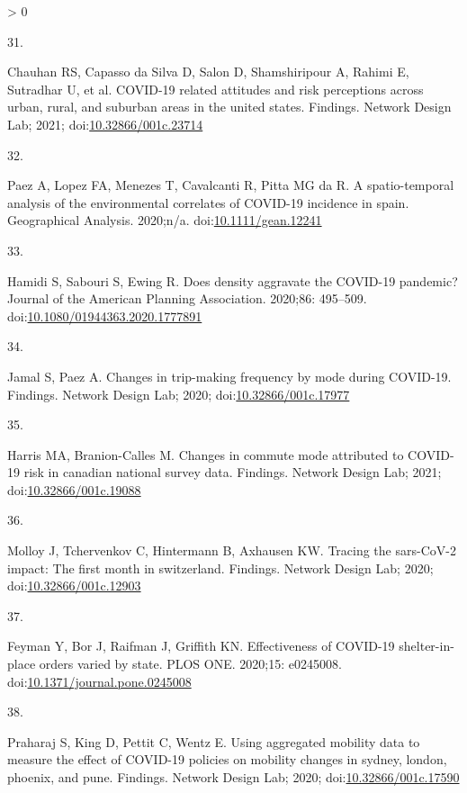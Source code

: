 \documentclass[10pt,letterpaper]{article}
\newlength{\csllabelwidth}
\newlength{\cslhangindent}
\newenvironment{CSLReferences}[3] %
 {%
  \setlength{\parindent}{0pt}
  \ifodd #1 \everypar{\setlength{\hangindent}{\cslhangindent}}\ignorespaces\fi
  \ifnum #2 > 0
  \setlength{\parskip}{#2\baselineskip}
  \fi
 }%
 {}
\newcommand{\CSLLeftMargin}[1]{\parbox[t]{\csllabelwidth}{#1}}
\newcommand{\CSLRightInline}[1]{\parbox[t]{\linewidth - \csllabelwidth}{#1}}
\begin{document}
\begin{CSLReferences}{0}{0}
\leavevmode\hypertarget{ref-Chauhan2021covid}{}%
\CSLLeftMargin{31. }
\CSLRightInline{Chauhan RS, Capasso da Silva D, Salon D, Shamshiripour
A, Rahimi E, Sutradhar U, et al. COVID-19 related attitudes and risk
perceptions across urban, rural, and suburban areas in the united
states. Findings. Network Design Lab; 2021;
doi:\href{https://doi.org/10.32866/001c.23714}{10.32866/001c.23714}}

\leavevmode\hypertarget{ref-Paez2020spatio}{}%
\CSLLeftMargin{32. }
\CSLRightInline{Paez A, Lopez FA, Menezes T, Cavalcanti R, Pitta MG da
R. A spatio-temporal analysis of the environmental correlates of
COVID-19 incidence in spain. Geographical Analysis. 2020;n/a.
doi:\href{https://doi.org/10.1111/gean.12241}{10.1111/gean.12241}}

\leavevmode\hypertarget{ref-Hamidi2020density}{}%
\CSLLeftMargin{33. }
\CSLRightInline{Hamidi S, Sabouri S, Ewing R. Does density aggravate the
COVID-19 pandemic? Journal of the American Planning Association.
2020;86: 495--509.
doi:\href{https://doi.org/10.1080/01944363.2020.1777891}{10.1080/01944363.2020.1777891}}

\leavevmode\hypertarget{ref-Jamal2020Changes}{}%
\CSLLeftMargin{34. }
\CSLRightInline{Jamal S, Paez A. Changes in trip-making frequency by
mode during COVID-19. Findings. Network Design Lab; 2020;
doi:\href{https://doi.org/10.32866/001c.17977}{10.32866/001c.17977}}

\leavevmode\hypertarget{ref-Harris2021Changes}{}%
\CSLLeftMargin{35. }
\CSLRightInline{Harris MA, Branion-Calles M. Changes in commute mode
attributed to COVID-19 risk in canadian national survey data. Findings.
Network Design Lab; 2021;
doi:\href{https://doi.org/10.32866/001c.19088}{10.32866/001c.19088}}

\leavevmode\hypertarget{ref-Molloy2020Tracing}{}%
\CSLLeftMargin{36. }
\CSLRightInline{Molloy J, Tchervenkov C, Hintermann B, Axhausen KW.
Tracing the sars-CoV-2 impact: The first month in switzerland. Findings.
Network Design Lab; 2020;
doi:\href{https://doi.org/10.32866/001c.12903}{10.32866/001c.12903}}

\leavevmode\hypertarget{ref-Feyman2020effectiveness}{}%
\CSLLeftMargin{37. }
\CSLRightInline{Feyman Y, Bor J, Raifman J, Griffith KN. Effectiveness
of COVID-19 shelter-in-place orders varied by state. PLOS ONE. 2020;15:
e0245008.
doi:\href{https://doi.org/10.1371/journal.pone.0245008}{10.1371/journal.pone.0245008}}

\leavevmode\hypertarget{ref-Praharaj2020Using}{}%
\CSLLeftMargin{38. }
\CSLRightInline{Praharaj S, King D, Pettit C, Wentz E. Using aggregated
mobility data to measure the effect of COVID-19 policies on mobility
changes in sydney, london, phoenix, and pune. Findings. Network Design
Lab; 2020;
doi:\href{https://doi.org/10.32866/001c.17590}{10.32866/001c.17590}}


\end{CSLReferences}
\end{document}
